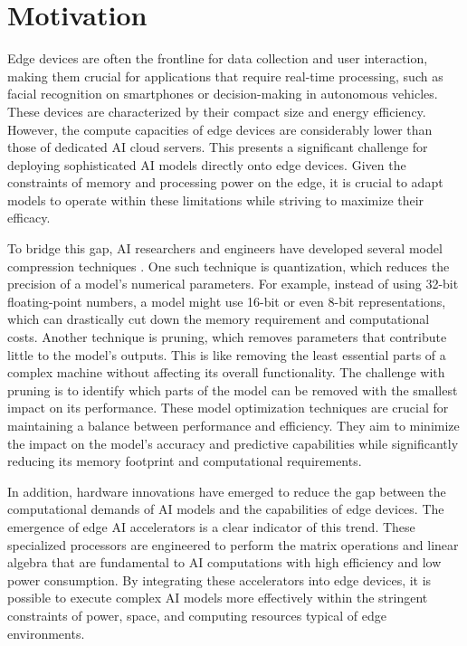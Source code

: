 \section{Motivation}
Edge devices are often the frontline for data collection and user interaction, making them crucial for applications that require real-time processing, such as facial recognition on smartphones or decision-making in autonomous vehicles.
These devices are characterized by their compact size and energy efficiency.
However, the compute capacities of edge devices are considerably lower than those of dedicated AI cloud servers.
This presents a significant challenge for deploying sophisticated AI models directly onto edge devices.
Given the constraints of memory and processing power on the edge, it is crucial to adapt models to operate within these limitations while striving to maximize their efficacy.

To bridge this gap, AI researchers and engineers have developed several model compression techniques \autocite{neillOverviewNeuralNetwork2020}.
One such technique is quantization, which reduces the precision of a model's numerical parameters.
For example, instead of using 32-bit floating-point numbers, a model might use 16-bit or even 8-bit representations, which can drastically cut down the memory requirement and computational costs.
Another technique is pruning, which removes parameters that contribute little to the model's outputs.
This is like removing the least essential parts of a complex machine without affecting its overall functionality.
The challenge with pruning is to identify which parts of the model can be removed with the smallest impact on its performance.
These model optimization techniques are crucial for maintaining a balance between performance and efficiency.
They aim to minimize the impact on the model's accuracy and predictive capabilities while significantly reducing its memory footprint and computational requirements.

In addition, hardware innovations have emerged to reduce the gap between the computational demands of AI models and the capabilities of edge devices.
The emergence of edge AI accelerators is a clear indicator of this trend.
These specialized processors are engineered to perform the matrix operations and linear algebra that are fundamental to AI computations with high efficiency and low power consumption.
By integrating these accelerators into edge devices, it is possible to execute complex AI models more effectively within the stringent constraints of power, space, and computing resources typical of edge environments.

